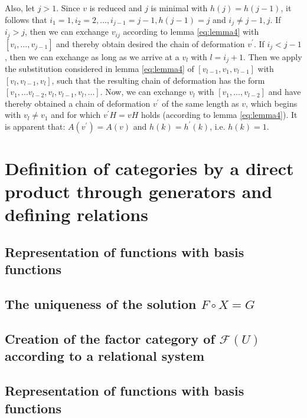 \documentclass{article}
\begin{document}
Also, let $j > 1$. Since $v$ is reduced and $j$ is minimal with $h(j) = h(j - 1)$, 
it follows that $i_1 = 1, i_2 = 2, \ldots, i_{j-1} = j - 1, h(j-1) = j$ and $i_j \neq j - 1, j$. If $i_j > j$, 
then we can exchange $v_{ij}$ according to lemma \ref{eq:lemma4} with $[v_i, \ldots, v_{j-1}]$ and thereby obtain desired the chain of deformation $v^{\prime}$.
If $i_j < j - 1$, then we can exchange as long as we arrive at a $v_l$ with $l = i_j + 1$. 
Then we apply the substitution considered in lemma \ref{eq:lemma4} of $[v_{l-1}, v_1, v_{l -1}]$ with $[v_l, v_{l-1}, v_l]$,
such that the resulting chain of deformation has the form $[v_1, \ldots v_{l-2}, v_l, v_{l-1}, v_l, \ldots]$.
Now, we can exchange $v_l$ with $[v_1, \ldots, v_{l-2}]$ and have thereby obtained a chain of deformation $v^{\prime}$ of the same length as $v$, 
which begins with $v_l \neq v_1$ and for which $v^{\prime}H = vH$ holds (according to lemma \ref{eq:lemma4}). It is apparent that: 
$A(v^{\prime})=A(v)$ and $h(k) = h^{\prime}(k)$, i.e. $h(k)=1$.

\section{Definition of categories by a direct product through generators and defining relations}
\subsection{Representation of functions with basis functions}
\label{basis-function-representation}
\subsection{The uniqueness of the solution $F \circ X = G$}
\subsection{Creation of the factor category of $\mathcal{F}(U)$ according to a relational system}
\subsection{Representation of functions with basis functions}
\end{document}
